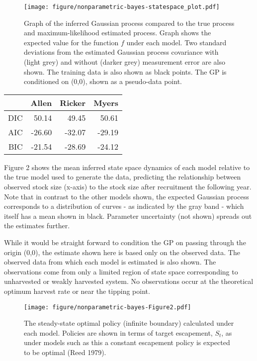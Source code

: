 \documentclass[author-year, review]{elsarticle} %
\makeatletter
\def\maxwidth{\ifdim\Gin@nat@width>\linewidth\linewidth
\else\Gin@nat@width\fi}
\let\Oldincludegraphics\includegraphics
\renewcommand{\includegraphics}[1]{\Oldincludegraphics[width=\maxwidth]{#1}}
\makeatother
\begin{document}
\begin{figure}[htbp]
\centering
\texttt{[image: figure/nonparametric-bayes-statespace\_plot.pdf]}
\caption{Graph of the inferred Gaussian process compared to the true
process and maximum-likelihood estimated process. Graph shows the
expected value for the function $f$ under each model. Two standard
deviations from the estimated Gaussian process covariance with (light
grey) and without (darker grey) measurement error are also shown. The
training data is also shown as black points. The GP is conditioned on
(0,0), shown as a pseudo-data point.}
\end{figure}

\begin{table}[ht]
\begin{center}
\begin{tabular}{rrrr}
  \hline
 & Allen & Ricker & Myers \\ 
  \hline
DIC & 50.14 & 49.45 & 50.61 \\ 
  AIC & -26.60 & -32.07 & -29.19 \\ 
  BIC & -21.54 & -28.69 & -24.12 \\ 
   \hline
\end{tabular}
\end{center}
\end{table}

Figure 2 shows the mean inferred state space dynamics of each model
relative to the true model used to generate the data, predicting the
relationship between observed stock size (x-axis) to the stock size
after recruitment the following year. Note that in contrast to the other
models shown, the expected Gaussian process corresponds to a
distribution of curves - as indicated by the gray band - which itself
has a mean shown in black. Parameter uncertainty (not shown) spreads out
the estimates further.

While it would be straight forward to condition the GP on passing
through the origin (0,0), the estimate shown here is based only on the
observed data. The observed data from which each model is estimated is
also shown. The observations come from only a limited region of state
space corresponding to unharvested or weakly harvested system. No
observations occur at the theoretical optimum harvest rate or near the
tipping point.

\begin{figure}[htbp]
\centering
\texttt{[image: figure/nonparametric-bayes-Figure2.pdf]}
\caption{The steady-state optimal policy (infinite boundary) calculated
under each model. Policies are shown in terms of target escapement,
$S_t$, as under models such as this a constant escapement policy is
expected to be optimal (Reed 1979).}
\end{figure}
\end{document}
